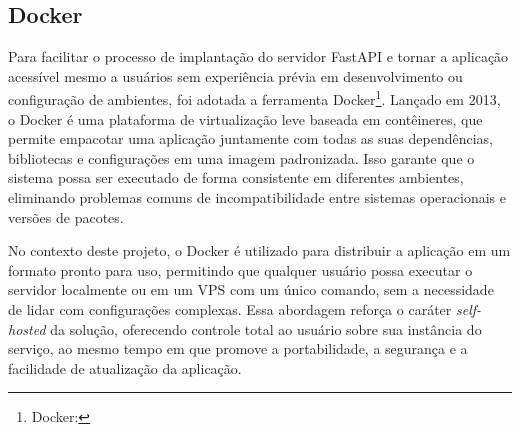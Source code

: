 \subsection{Docker}

Para facilitar o processo de implantação do servidor FastAPI e tornar
a aplicação acessível mesmo a usuários sem experiência prévia em
desenvolvimento ou configuração de ambientes, foi adotada a
ferramenta Docker\footnote{Docker: }.
Lançado em 2013, o Docker é uma plataforma de
virtualização leve baseada em contêineres, que permite empacotar uma
aplicação juntamente com todas as suas dependências, bibliotecas e
configurações em uma imagem padronizada. Isso garante que o sistema
possa ser executado de forma consistente em diferentes ambientes,
eliminando problemas comuns de incompatibilidade entre sistemas
operacionais e versões de pacotes.

No contexto deste projeto, o Docker é utilizado para distribuir a
aplicação em um formato pronto para uso, permitindo que qualquer
usuário possa executar o servidor localmente ou em um \acs{VPS} com um
único comando, sem a necessidade de lidar com configurações
complexas. Essa abordagem reforça o caráter
\textit{\gls{self-hosted}} da solução,
oferecendo controle total ao usuário sobre sua instância do serviço,
ao mesmo tempo em que promove a portabilidade, a segurança e a
facilidade de atualização da aplicação.

\newpage

